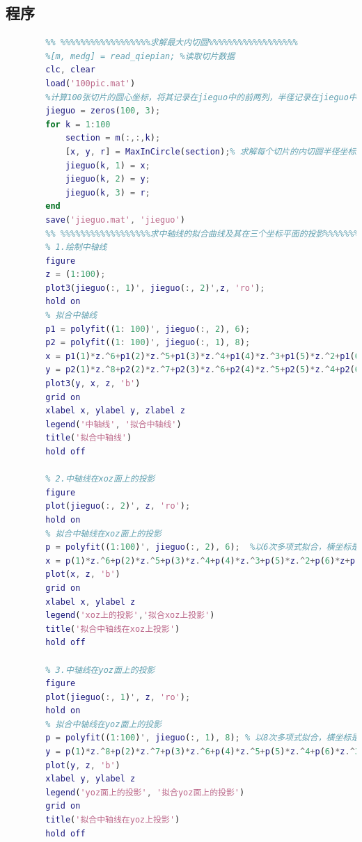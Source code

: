     \subsection{程序}
        \par
        \begin{lstlisting}[language = Matlab]
        %%%%%%%%%%%%%%%%%%%%%血管重建主程序%%%%%%%%%%%%%%%%%%%%%%
        %% %%%%%%%%%%%%%%%%%%求解最大内切圆%%%%%%%%%%%%%%%%%%
        %[m, medg] = read_qiepian; %读取切片数据
        clc, clear
        load('100pic.mat')
        %计算100张切片的圆心坐标，将其记录在jieguo中的前两列，半径记录在jieguo中的第三列
        jieguo = zeros(100, 3);
        for k = 1:100
            section = m(:,:,k);
            [x, y, r] = MaxInCircle(section);% 求解每个切片的内切圆半径坐标x^k,y^k，及半径r^k
            jieguo(k, 1) = x;
            jieguo(k, 2) = y;
            jieguo(k, 3) = r;
        end
        save('jieguo.mat', 'jieguo')
        %% %%%%%%%%%%%%%%%%%%求中轴线的拟合曲线及其在三个坐标平面的投影%%%%%%%%%%%%%%%%%%
        % 1.绘制中轴线
        figure
        z = (1:100);
        plot3(jieguo(:, 1)', jieguo(:, 2)',z, 'ro');
        hold on
        % 拟合中轴线
        p1 = polyfit((1: 100)', jieguo(:, 2), 6);
        p2 = polyfit((1: 100)', jieguo(:, 1), 8);
        x = p1(1)*z.^6+p1(2)*z.^5+p1(3)*z.^4+p1(4)*z.^3+p1(5)*z.^2+p1(6)*z+p1(7);
        y = p2(1)*z.^8+p2(2)*z.^7+p2(3)*z.^6+p2(4)*z.^5+p2(5)*z.^4+p2(6)*z.^3+p2(7)*z.^2+p2(8)*z+p2(9);
        plot3(y, x, z, 'b')
        grid on
        xlabel x, ylabel y, zlabel z
        legend('中轴线', '拟合中轴线')
        title('拟合中轴线')
        hold off

        % 2.中轴线在xoz面上的投影
        figure
        plot(jieguo(:, 2)', z, 'ro');
        hold on
        % 拟合中轴线在xoz面上的投影
        p = polyfit((1:100)', jieguo(:, 2), 6);  %以6次多项式拟合，横坐标是1到100
        x = p(1)*z.^6+p(2)*z.^5+p(3)*z.^4+p(4)*z.^3+p(5)*z.^2+p(6)*z+p(7);
        plot(x, z, 'b')
        grid on
        xlabel x, ylabel z
        legend('xoz上的投影','拟合xoz上投影')
        title('拟合中轴线在xoz上投影')
        hold off

        % 3.中轴线在yoz面上的投影
        figure
        plot(jieguo(:, 1)', z, 'ro');
        hold on
        % 拟合中轴线在yoz面上的投影
        p = polyfit((1:100)', jieguo(:, 1), 8); % 以8次多项式拟合，横坐标是1到100
        y = p(1)*z.^8+p(2)*z.^7+p(3)*z.^6+p(4)*z.^5+p(5)*z.^4+p(6)*z.^3+p(7)*z.^2+p(8)*z+p(9);
        plot(y, z, 'b')
        xlabel y, ylabel z
        legend('yoz面上的投影', '拟合yoz面上的投影')
        grid on
        title('拟合中轴线在yoz上投影')
        hold off


\end{lstlisting}

